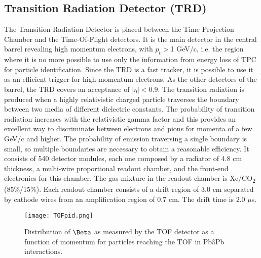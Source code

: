 \subsection{Transition Radiation Detector (TRD)}
The Transition Radiation Detector \cite{TRD-TDR} is placed between the Time Projection Chamber and the Time-Of-Flight detectors. It is the main detector in the central barrel revealing high momentum electrons, with $p_t >$1 GeV/c, i.e. the region where it is no more possible to use only the information from energy loss of TPC for particle identification. Since the TRD is a fast tracker, it is possible to use it as an efficient trigger for high-momentum electrons. As the other detectors of the barrel, the TRD covers an acceptance of $|\eta|<$0.9.
The transition radiation is produced when a highly relativistic charged particle traverses the boundary between two media of different dielectric constants. The probability of transition radiation increases with the relativistic gamma factor and this provides an excellent way to discriminate between electrons and pions for momenta of a few GeV/c and higher. The probability of emission traversing a single boundary is small, so multiple boundaries are necessary to obtain a reasonable efficiency.
It consists of 540 detector modules, each one composed by a radiator of 4.8 cm thickness, a multi-wire proportional readout chamber, and the front-end electronics for this chamber. The gas mixture in the readout chamber is Xe/CO\textsubscript{2} (85\%/15\%). Each readout chamber consists of a drift region of 3.0 cm separated by cathode wires from an amplification region of 0.7 cm. The drift time is 2.0 $\mu$s.
\begin{figure}[b]
\centering
\texttt{[image: TOFpid.png]}
\caption{Distribution of $\Beta$ as measured by the TOF detector as a function of momentum for particles reaching the
TOF in PbâPb interactions.}
\label{fig:TOFpid}
\end{figure}


